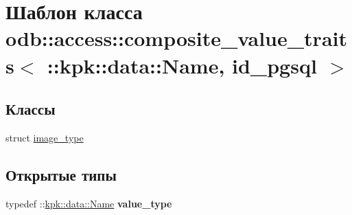 \hypertarget{classodb_1_1access_1_1composite__value__traits_3_01_1_1kpk_1_1data_1_1_name_00_01id__pgsql_01_4}{}\section{Шаблон класса odb\+:\+:access\+:\+:composite\+\_\+value\+\_\+traits$<$ \+:\+:kpk\+:\+:data\+:\+:Name, id\+\_\+pgsql $>$}
\label{classodb_1_1access_1_1composite__value__traits_3_01_1_1kpk_1_1data_1_1_name_00_01id__pgsql_01_4}
\subsection*{Классы}
\begin{DoxyCompactItemize}
\item 
struct \hyperlink{structodb_1_1access_1_1composite__value__traits_3_01_1_1kpk_1_1data_1_1_name_00_01id__pgsql_01_4_1_1image__type}{image\+\_\+type}
\end{DoxyCompactItemize}
\subsection*{Открытые типы}
\begin{DoxyCompactItemize}
\item 
typedef \+::\hyperlink{classkpk_1_1data_1_1_name}{kpk\+::data\+::\+Name} {\bfseries value\+\_\+type}\hypertarget{classodb_1_1access_1_1composite__value__traits_3_01_1_1kpk_1_1data_1_1_name_00_01id__pgsql_01_4_acec886a672b764f7b1905844cf7b5446}{}\label{classodb_1_1access_1_1composite__value__traits_3_01_1_1kpk_1_1data_1_1_name_00_01id__pgsql_01_4_acec886a672b764f7b1905844cf7b5446}

\end{DoxyCompactItemize}
